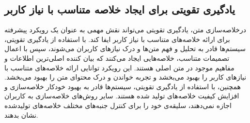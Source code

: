 \subsection{ یادگیری تقویتی برای ایجاد خلاصه متناسب با نیاز کاربر}
درخلاصه‌سازی متن، یادگیری تقویتی می‌تواند نقش مهمی به عنوان یک رویکرد پیشرفته برای ارائه خلاصه‌های متناسب با نیاز کاربر ایفا کند. با استفاده از یادگیری تقویتی، سیستم‌ها قادر به تحلیل و فهم متن‌ها و درک نیازهای کاربران می‌شوند، سپس با اعمال تصمیمات متناسب، خلاصه‌هایی ایجاد می‌کنند که بیان کننده اصلی‌ترین اطلاعات و مفاهیم موجود در متن اصلی هستند. این رویکرد توانایی ارائه خلاصه‌های متناسب با نیازهای کاربر را بهبود می‌بخشد و تجربه خواندن و درک محتوای متن را بهبود می‌بخشد. همچنین، با استفاده از یادگیری تقویتی، سیستم‌ها قادر به بهبود خودکار خلاصه‌سازی و افزایش کیفیت خلاصه‌های تولید شده هستند. %
سایر روش‌های خلاصه‌سازی به کاربران اجازه نمی‌دهند، سلیقه‌ی خود را برای کنترل  جنبه‌های مختلف خلاصه‌های تولیدشده نشان بدهند. 

